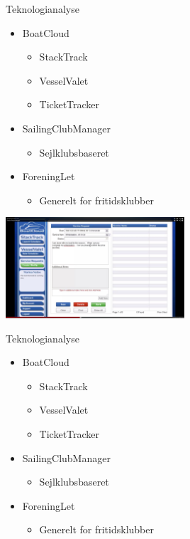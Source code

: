 \begin{frame}{Teknologianalyse}
  \begin{itemize}
    \item BoatCloud
    \begin{itemize}
      \item StackTrack
      \item VesselValet
      \item TicketTracker
    \end{itemize}
    \item SailingClubManager
    \begin{itemize}
      \item Sejlklubsbaseret
    \end{itemize}
    \item ForeningLet
    \begin{itemize}
      \item Generelt for fritidsklubber
    \end{itemize}
  \end{itemize}
  \begin{center}
        \includegraphics[width=0.5\textwidth]{images/TicketTracker.jpg}
\end{center} 

\end{frame}

\begin{frame}{Teknologianalyse}
  \begin{itemize}
    \item BoatCloud
    \begin{itemize}
      \item StackTrack
      \item VesselValet
      \item TicketTracker
    \end{itemize}
    \item SailingClubManager
    \begin{itemize}
      \item Sejlklubsbaseret
    \end{itemize}
    \item ForeningLet
    \begin{itemize}
      \item Generelt for fritidsklubber
    \end{itemize}
  \end{itemize}

\end{frame}


